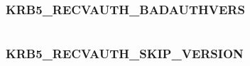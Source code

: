 \documentclass[letterpaper,10pt,english]{sphinxmanual}
\begin{document}
\begin{fulllineitems}
\label{appdev/refs/macros/KRB5_REALM_BRANCH_CHAR:KRB5_REALM_BRANCH_CHAR}
\end{fulllineitems}


\begin{tabulary}{\linewidth}{|L|L|}
\hline

 & 
\\\hline
\end{tabulary}



\subsubsection{KRB5\_RECVAUTH\_BADAUTHVERS}
\label{appdev/refs/macros/KRB5_RECVAUTH_BADAUTHVERS:krb5-recvauth-badauthvers-data}\label{appdev/refs/macros/KRB5_RECVAUTH_BADAUTHVERS:krb5-recvauth-badauthvers}\label{appdev/refs/macros/KRB5_RECVAUTH_BADAUTHVERS::doc}

\begin{fulllineitems}
\label{appdev/refs/macros/KRB5_RECVAUTH_BADAUTHVERS:KRB5_RECVAUTH_BADAUTHVERS}
\end{fulllineitems}


\begin{tabulary}{\linewidth}{|L|L|}
\hline

 & 
\\\hline
\end{tabulary}



\subsubsection{KRB5\_RECVAUTH\_SKIP\_VERSION}
\label{appdev/refs/macros/KRB5_RECVAUTH_SKIP_VERSION:krb5-recvauth-skip-version}\label{appdev/refs/macros/KRB5_RECVAUTH_SKIP_VERSION:krb5-recvauth-skip-version-data}\label{appdev/refs/macros/KRB5_RECVAUTH_SKIP_VERSION::doc}

\begin{fulllineitems}
\label{appdev/refs/macros/KRB5_RECVAUTH_SKIP_VERSION:KRB5_RECVAUTH_SKIP_VERSION}
\end{fulllineitems}
\end{document}
